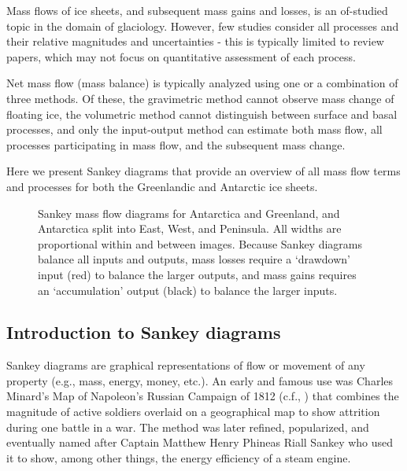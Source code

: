 \documentclass[jog]{igs}
\begin{document}
Mass flows of ice sheets, and subsequent mass gains and losses, is an of-studied topic in the domain of glaciology. However, few studies consider all processes and their relative magnitudes and uncertainties - this is typically limited to review papers, which may not focus on quantitative assessment of each process.

Net mass flow (mass balance) is typically analyzed using one or a combination of three methods. Of these, the gravimetric method cannot observe mass change of floating ice, the volumetric method cannot distinguish between surface and basal processes, and only the input-output method can estimate both mass flow, all processes participating in mass flow, and the subsequent mass change.

Here we present Sankey diagrams that provide an overview of all mass flow terms and processes for both the Greenlandic and Antarctic ice sheets.


\begin{figure*}
\caption{Sankey mass flow diagrams for Antarctica and Greenland, and Antarctica split into East, West, and Peninsula. All widths are proportional within and between images. Because Sankey diagrams balance all inputs and outputs, mass losses require a `drawdown' input (red) to balance the larger outputs, and mass gains requires an `accumulation' output (black) to balance the larger inputs.}
\label{fig}
\end{figure*}

\subsection{Introduction to Sankey diagrams}

Sankey diagrams are graphical representations of flow or movement of any property (e.g., mass, energy, money, etc.). An early and famous use was Charles Minard's Map of Napoleon's Russian Campaign of 1812 (c.f., \citet{kraak_2021}) that combines the magnitude of active soldiers overlaid on a geographical map to show attrition during one battle in a war. The method was later refined, popularized, and eventually named after Captain Matthew Henry Phineas Riall Sankey who used it to show, among other things, the energy efficiency of a steam engine.
\end{document}
